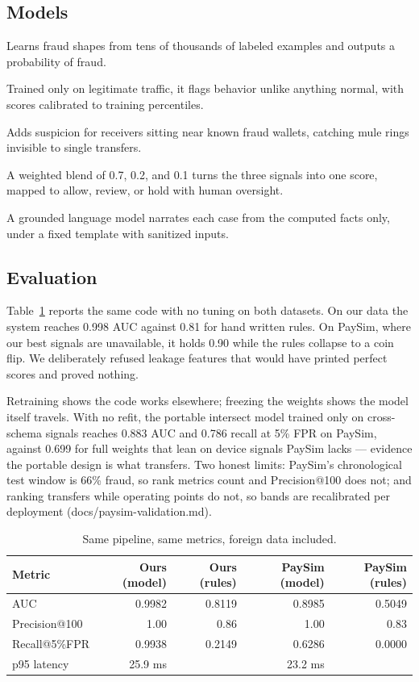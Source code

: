 \documentclass[11pt,a4paper]{article}
\begin{document}
\subsection{Models}

\begin{description}[nosep]
  \item[XGBoost classifier.] Learns fraud shapes from tens of thousands of
    labeled examples and outputs a probability of fraud.
  \item[IsolationForest.] Trained only on legitimate traffic, it flags behavior
    unlike anything normal, with scores calibrated to training percentiles.
  \item[Transaction graph.] Adds suspicion for receivers sitting near known
    fraud wallets, catching mule rings invisible to single transfers.
  \item[Ensemble.] A weighted blend of 0.7, 0.2, and 0.1 turns the three
    signals into one score, mapped to allow, review, or hold with human
    oversight.
\end{description}
A grounded language model narrates each case from the computed facts only,
under a fixed template with sanitized inputs.

\subsection{Evaluation}

Table~\ref{tab:eval} reports the same code with no tuning on both datasets.
On our data the system reaches 0.998 AUC against 0.81 for hand written rules.
On PaySim, where our best signals are unavailable, it holds 0.90 while the
rules collapse to a coin flip. We deliberately refused leakage features that
would have printed perfect scores and proved nothing.

Retraining shows the code works elsewhere; freezing the weights shows the
model itself travels. With no refit, the portable intersect model trained
only on cross-schema signals reaches 0.883 AUC and 0.786 recall at 5\%
FPR on PaySim, against 0.699 for full weights that lean on device signals
PaySim lacks --- evidence the portable design is what transfers. Two honest
limits: PaySim's chronological test window is 66\% fraud, so rank metrics
count and Precision@100 does not; and ranking transfers while operating
points do not, so bands are recalibrated per deployment
(docs/paysim-validation.md).

\begin{table}[htbp]
\centering
\caption{Same pipeline, same metrics, foreign data included.}
\label{tab:eval}
\begin{tabular}{@{}lrrrr@{}}
\toprule
Metric & Ours (model) & Ours (rules) & PaySim (model) & PaySim (rules) \\
\midrule
AUC & 0.9982 & 0.8119 & 0.8985 & 0.5049 \\
Precision@100 & 1.00 & 0.86 & 1.00 & 0.83 \\
Recall@5\%FPR & 0.9938 & 0.2149 & 0.6286 & 0.0000 \\
p95 latency & 25.9 ms & & 23.2 ms & \\
\bottomrule
\end{tabular}
\end{table}
\end{document}
